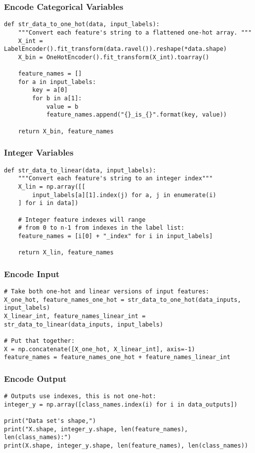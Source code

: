 \begin{frame}[fragile]\frametitle{Encode Categorical Variables}
\begin{lstlisting}
def str_data_to_one_hot(data, input_labels):
    """Convert each feature's string to a flattened one-hot array. """
    X_int = LabelEncoder().fit_transform(data.ravel()).reshape(*data.shape)
    X_bin = OneHotEncoder().fit_transform(X_int).toarray()
    
    feature_names = []
    for a in input_labels:
        key = a[0]
        for b in a[1]:
            value = b
            feature_names.append("{}_is_{}".format(key, value))

    return X_bin, feature_names
\end{lstlisting}
\end{frame}

\begin{frame}[fragile]\frametitle{Integer Variables}
\begin{lstlisting}
def str_data_to_linear(data, input_labels):
    """Convert each feature's string to an integer index"""
    X_lin = np.array([[
        input_labels[a][1].index(j) for a, j in enumerate(i)
    ] for i in data])
    
    # Integer feature indexes will range
    # from 0 to n-1 from indexes in the label list:
    feature_names = [i[0] + "_index" for i in input_labels]
    
    return X_lin, feature_names
\end{lstlisting}
\end{frame}


\begin{frame}[fragile]\frametitle{Encode Input}
\begin{lstlisting}
# Take both one-hot and linear versions of input features: 
X_one_hot, feature_names_one_hot = str_data_to_one_hot(data_inputs, input_labels)
X_linear_int, feature_names_linear_int = str_data_to_linear(data_inputs, input_labels)

# Put that together:
X = np.concatenate([X_one_hot, X_linear_int], axis=-1)
feature_names = feature_names_one_hot + feature_names_linear_int
\end{lstlisting}
\end{frame}


\begin{frame}[fragile]\frametitle{Encode Output}
\begin{lstlisting}
# Outputs use indexes, this is not one-hot:
integer_y = np.array([class_names.index(i) for i in data_outputs])

print("Data set's shape,")
print("X.shape, integer_y.shape, len(feature_names), len(class_names):")
print(X.shape, integer_y.shape, len(feature_names), len(class_names))
\end{lstlisting}
\end{frame}

